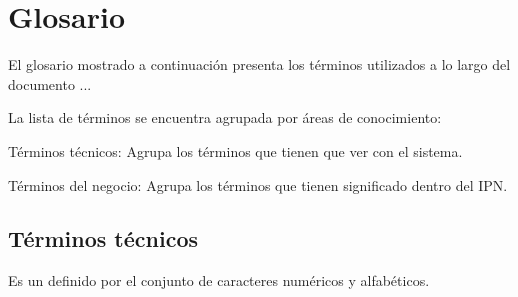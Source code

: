 \chapter{Glosario}
\label{ch:glosario}


	El glosario mostrado a continuación presenta los términos utilizados a lo largo del documento ... 
	
    \noindent La lista de términos se encuentra agrupada por áreas de conocimiento:

	\begin{Citemize}
		\item Términos técnicos: Agrupa los términos que tienen que ver con el sistema.
		\item Términos del negocio: Agrupa los términos que tienen significado dentro del IPN.
	\end{Citemize}

\section{Términos técnicos}
\label{gls:terminosTecnicos}


\begin{bGlosario}

	 Es un  definido por el conjunto de caracteres numéricos y alfabéticos.

\end{bGlosario}
